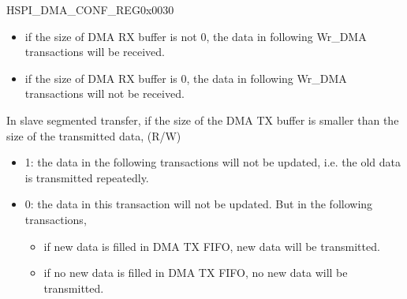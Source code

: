 \begin{register}{H}{SPI\_DMA\_CONF\_REG}{0x0030}
\begin{regdesc}
\begin{reglist}
\begin{itemize}
    \item if the size of DMA RX buffer is not 0, the data in following Wr\_DMA transactions will be received.
    \item if the size of DMA RX buffer is 0, the data in following Wr\_DMA transactions will not be received.
\end{itemize} 
\label{fielddesc:SPISLVTXSEGTRANSCLREN}\item [SPI\_SLV\_TX\_SEG\_TRANS\_CLR\_EN] In slave segmented transfer, if the size of the DMA TX buffer is smaller than the size of the transmitted data, (R/W)
\begin{itemize}
    \item 1: the data in the following transactions will not be updated, i.e. the old data is transmitted repeatedly. 
    \item 0: the data in this transaction will not be updated. But in the following transactions, 
    \begin{itemize}
        \item if new data is filled in DMA TX FIFO, new data will be transmitted.
        \item if no new data is filled in DMA TX FIFO, no new data will be transmitted.
    
    \end{itemize}
    \end{itemize}
\item [Continued on the next page...]
\end{reglist}\end{regdesc}
\end{register}

